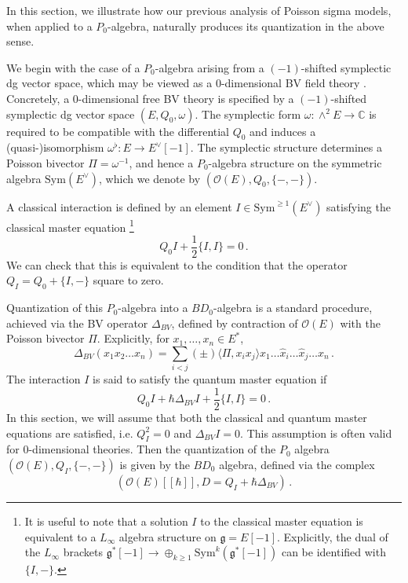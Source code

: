 \documentclass[11pt]{article}
\newcommand{\C}{\mathbb{C}}
\numberwithin{equation}{section}
\begin{document}
In this section, we illustrate how our previous analysis of Poisson sigma models, when applied to a $P_0$-algebra, naturally produces its quantization in the above sense.

We begin with the case of a $P_0$-algebra arising from a $(-1)$-shifted symplectic dg vector space, which may be viewed as a $0$-dimensional BV field theory \cite{Li:2017exk}. Concretely, a $0$-dimensional free BV theory is specified by a $(-1)$-shifted symplectic dg vector space $(E,Q_0,\omega)$. The symplectic form $\omega:\wedge^2 E\to \C$ is required to be compatible with the differential $Q_0$ and induces a (quasi-)isomorphism $\omega^\flat: E\to E^\vee[-1]$. The symplectic structure determines a Poisson bivector $\Pi=\omega^{-1}$, and hence a $P_0$-algebra structure on the symmetric algebra $\mathrm{Sym}(E^\vee)$, which we denote by $(\mathcal{O}(E),Q_0,\{-,-\})$.

A classical interaction is defined by an element $I \in \mathrm{Sym}^{\geq 1}(E^\vee)$ satisfying the classical master equation \footnote{It is useful to note that a solution $I$ to the classical master equation is equivalent to a $L_\infty$ algebra structure on $\mathfrak{g} = E[-1]$. Explicitly, the dual of the $L_\infty$ brackets $\mathfrak{g}^*[-1] \to \oplus_{k\geq 1}\mathrm{Sym}^k(\mathfrak{g}^*[-1])$ can be identified with $\{I,-\}$.}
\begin{equation}
	Q_0I + \frac{1}{2}\{I, I\} = 0\,.
\end{equation}
We can check that this is equivalent to the condition that the operator $Q_I = Q_0 + \{I,-\}$ square to zero.

Quantization of this $P_0$-algebra into a $BD_0$-algebra is a standard procedure, achieved via the BV operator $\Delta_{BV}$, defined by contraction of $\mathcal{O}(E)$ with the Poisson bivector $\Pi$. Explicitly, for $x_1, \dots, x_n \in E^*$,
\begin{equation}
	\Delta_{BV}(x_1 x_2 \dots x_n)
	= \sum_{i<j} (\pm)\langle \Pi, x_i x_j \rangle x_1 \dots \hat{x}_i \dots \hat{x}_j \dots x_n \,.
\end{equation}
The interaction $I$ is said to satisfy the quantum master equation if
\begin{equation}
	Q_0I + \hbar \Delta_{BV} I + \frac{1}{2}\{I, I\} = 0\,.
\end{equation}
In this section, we will assume that both the classical and quantum master equations are satisfied, i.e. $Q_I^2 = 0$ and $\Delta_{BV} I = 0$. This assumption is often valid for $0$-dimensional theories. Then the quantization of the $P_0$ algebra $(\mathcal{O}(E), Q_I,\{-,-\})$ is given by the $BD_0$ algebra, defined via the complex
\begin{equation}\label{eq:0d_BV}
	(\mathcal{O}(E)[[\hbar]], D = Q_I+ \hbar\Delta_{BV})\,.
\end{equation}
\end{document}
